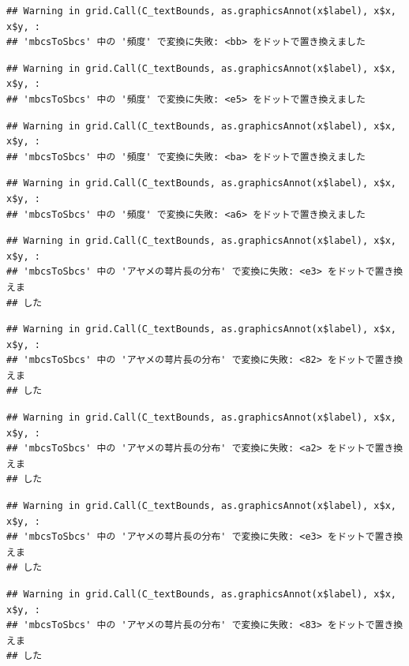 \documentclass[
]{book}
\begin{document}
\begin{verbatim}
## Warning in grid.Call(C_textBounds, as.graphicsAnnot(x$label), x$x, x$y, :
## 'mbcsToSbcs' 中の '頻度' で変換に失敗: <bb> をドットで置き換えました
\end{verbatim}

\begin{verbatim}
## Warning in grid.Call(C_textBounds, as.graphicsAnnot(x$label), x$x, x$y, :
## 'mbcsToSbcs' 中の '頻度' で変換に失敗: <e5> をドットで置き換えました
\end{verbatim}

\begin{verbatim}
## Warning in grid.Call(C_textBounds, as.graphicsAnnot(x$label), x$x, x$y, :
## 'mbcsToSbcs' 中の '頻度' で変換に失敗: <ba> をドットで置き換えました
\end{verbatim}

\begin{verbatim}
## Warning in grid.Call(C_textBounds, as.graphicsAnnot(x$label), x$x, x$y, :
## 'mbcsToSbcs' 中の '頻度' で変換に失敗: <a6> をドットで置き換えました
\end{verbatim}

\begin{verbatim}
## Warning in grid.Call(C_textBounds, as.graphicsAnnot(x$label), x$x, x$y, :
## 'mbcsToSbcs' 中の 'アヤメの萼片長の分布' で変換に失敗: <e3> をドットで置き換えま
## した
\end{verbatim}

\begin{verbatim}
## Warning in grid.Call(C_textBounds, as.graphicsAnnot(x$label), x$x, x$y, :
## 'mbcsToSbcs' 中の 'アヤメの萼片長の分布' で変換に失敗: <82> をドットで置き換えま
## した
\end{verbatim}

\begin{verbatim}
## Warning in grid.Call(C_textBounds, as.graphicsAnnot(x$label), x$x, x$y, :
## 'mbcsToSbcs' 中の 'アヤメの萼片長の分布' で変換に失敗: <a2> をドットで置き換えま
## した
\end{verbatim}

\begin{verbatim}
## Warning in grid.Call(C_textBounds, as.graphicsAnnot(x$label), x$x, x$y, :
## 'mbcsToSbcs' 中の 'アヤメの萼片長の分布' で変換に失敗: <e3> をドットで置き換えま
## した
\end{verbatim}

\begin{verbatim}
## Warning in grid.Call(C_textBounds, as.graphicsAnnot(x$label), x$x, x$y, :
## 'mbcsToSbcs' 中の 'アヤメの萼片長の分布' で変換に失敗: <83> をドットで置き換えま
## した
\end{verbatim}
\end{document}

